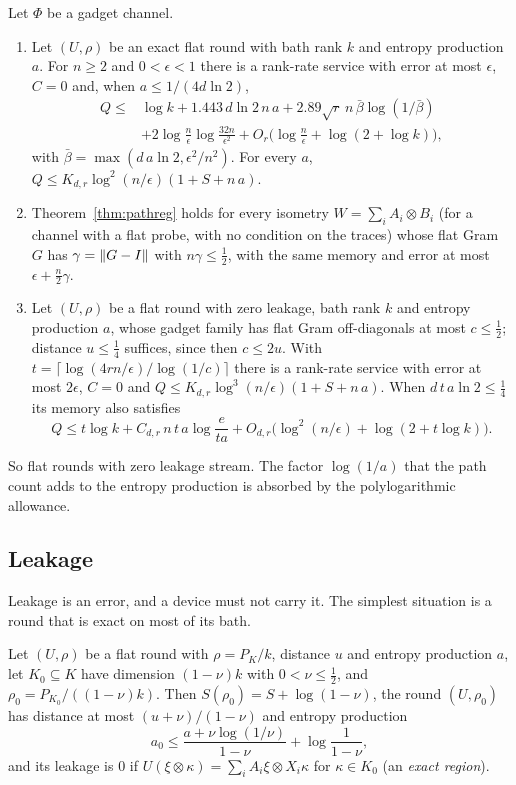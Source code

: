 \begin{theorem}\label{thm:flat-zero}
Let $\Phi$ be a gadget channel.
\begin{enumerate}[label=(\alph*),itemsep=1pt]
\item Let $(U,\rho)$ be an exact flat round with bath rank $k$ and entropy production $a$. For $n\ge2$ and $0<\epsilon<1$ there is a rank-rate
service with error at most $\epsilon$, $C=0$ and, when $a\le1/(4d\ln2)$,
\begin{align*}
Q\le{}&\log k+1.443\,d\ln2\,n\,a+2.89\sqrt r\,n\,\bar\beta\log(1/\bar\beta)\\
&+2\log\tfrac n\epsilon\log\tfrac{32n}{\epsilon^2}+O_r\bigl(\log\tfrac n\epsilon+\log(2+\log k)\bigr),
\end{align*}
with $\bar\beta=\max(d\,a\ln2,\epsilon^2/n^2)$. For every $a$, $Q\le K_{d,r}\log^2(n/\epsilon)(1+S+n\,a)$.
\item Theorem~\ref{thm:pathreg} holds for every isometry $W=\sum_iA_i\otimes B_i$ (for a channel with a flat probe, with no condition on the
traces) whose flat Gram $G$ has $\gamma=\lVert G-I\rVert$ with $n\gamma\le\frac12$, with the same memory and error at most $\epsilon+\frac n2\gamma$.
\item Let $(U,\rho)$ be a flat round with zero leakage, bath rank $k$ and entropy production $a$, whose gadget family has flat Gram
off-diagonals at most $c\le\frac12$; distance $u\le\frac14$ suffices, since then $c\le2u$. With $t=\lceil\log(4rn/\epsilon)/\log(1/c)\rceil$ there is a
rank-rate service with error at most $2\epsilon$, $C=0$ and $Q\le K_{d,r}\log^3(n/\epsilon)(1+S+n\,a)$. When $d\,t\,a\ln2\le\frac14$ its
memory also satisfies
\[
Q\le t\log k+C_{d,r}\,n\,t\,a\log\frac e{ta}+O_{d,r}\bigl(\log^2(n/\epsilon)+\log(2+t\log k)\bigr).
\]
\end{enumerate}
\end{theorem}

So flat rounds with zero leakage stream. The factor $\log(1/a)$ that the path count adds to the entropy production is absorbed by the
polylogarithmic allowance.

\subsection{Leakage}

Leakage is an error, and a device must not carry it. The simplest situation is a round that is exact on most of its bath.

\begin{lemma}\label{lem:restrict}
Let $(U,\rho)$ be a flat round with $\rho=P_K/k$, distance $u$ and entropy production $a$, let $K_0\subseteq K$ have dimension $(1-\nu)k$ with
$0<\nu\le\frac12$, and $\rho_0=P_{K_0}/((1-\nu)k)$. Then $S(\rho_0)=S+\log(1-\nu)$, the round $(U,\rho_0)$ has distance at most $(u+\nu)/(1-\nu)$
and entropy production
\[
a_0\le\frac{a+\nu\log(1/\nu)}{1-\nu}+\log\frac1{1-\nu},
\]
and its leakage is $0$ if $U(\xi\otimes\kappa)=\sum_iA_i\xi\otimes X_i\kappa$ for $\kappa\in K_0$ (an \emph{exact region}).
\end{lemma}


